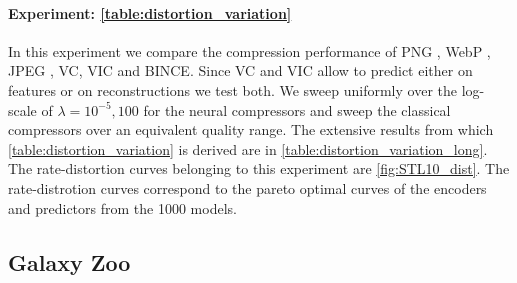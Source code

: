 \documentclass[final]{article}
\begin{document}
\paragraph{Experiment: \cref{table:distortion_variation}}
In this experiment we compare the compression performance of PNG \cite{graphics_png_isoiec_2003}, WebP \cite{webp_google_2018}, JPEG \cite{group_jpeg_itu-t_1992}, VC, VIC and BINCE. 
Since VC and VIC allow to predict either on features or on reconstructions we test both. We sweep uniformly over the log-scale of $\lambda=10^{-5},100$ for the neural compressors and sweep the classical compressors over an equivalent quality range. 
The extensive results from which \cref{table:distortion_variation} is derived are in \cref{table:distortion_variation_long}. The rate-distortion curves belonging to this experiment are \cref{fig:STL10_dist}.
The rate-distrotion curves correspond to the pareto optimal curves of the encoders and predictors from the 1000 models.



\subsection{Galaxy Zoo}
\label{appx:reproducability_galaxy}
\end{document}
